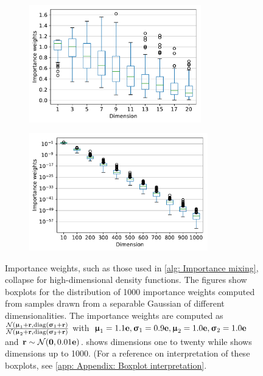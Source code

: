 \begin{figure}[tbp!]
    \begin{subfigure}[b]{0.485\textwidth}
        \centering
        \includegraphics[height=5.1cm]{graphics/importance_mixing/importance_weights_boxplot1.pdf}
        \caption{}
        \label{fig: Theory: importance_mixing/importance_weights_boxplot1.pdf}
    \end{subfigure}
    \hfill
    \begin{subfigure}[b]{0.495\textwidth}
        \centering
        \includegraphics[height=5.1cm]{graphics/importance_mixing/importance_weights_boxplot2.pdf}
        \caption{}
        \label{fig: Theory: importance_mixing/importance_weights_boxplot.pdf2}
    \end{subfigure}
    \caption{Importance weights, such as those used in \autoref{alg: Importance mixing}, collapse for high-dimensional density functions. The figures show boxplots for the distribution of 1000 importance weights computed from samples drawn from a separable Gaussian of different dimensionalities. The importance weights are computed as $\frac{\mathcal{N}({\boldsymbol{\upmu}}_1+{\mathbf{r}},\text{diag}({\boldsymbol{\upsigma}}_1+{\mathbf{r}})}{\mathcal{N}({\boldsymbol{\upmu}}_2+{\mathbf{r}},\text{diag}({\boldsymbol{\upsigma}}_2+{\mathbf{r}})}$ with ${\boldsymbol{\upmu}}_1=1.1{\mathbf{e}}, {\boldsymbol{\upsigma}}_1=0.9{\mathbf{e}}, {\boldsymbol{\upmu}}_2=1.0{\mathbf{e}}, {\boldsymbol{\upsigma}}_2=1.0{\mathbf{e}}$ and ${\mathbf{r}}\sim\mathcal{N}({\mathbf{0}},0.01{\mathbf{e}})$.  shows dimensions one to twenty while  shows dimensions up to 1000. (For a reference on interpretation of these boxplots, see \autoref{app: Appendix: Boxplot interpretation}.
    }
    \label{fig: Theory: importance_mixing/importance_weights_boxplot}
\end{figure}


